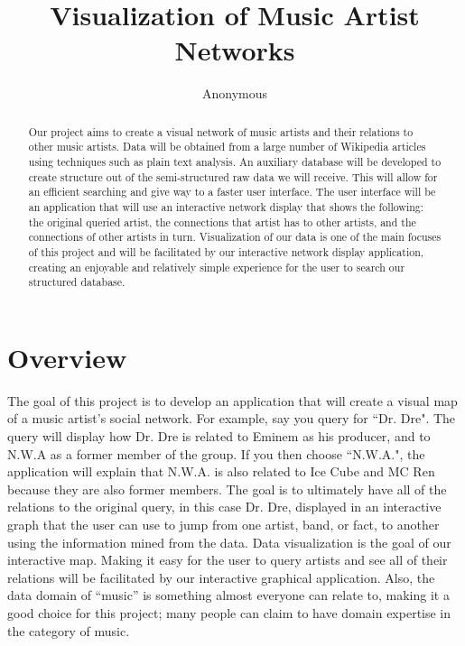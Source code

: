 \documentclass{sig-alternate}
\begin{document}
\title{Visualization of Music Artist Networks }
\author{
\alignauthor
Anonymous
}

\maketitle

\begin {abstract}
Our project aims to create a visual network of music artists 
and their relations to other music artists. Data will be obtained 
from a large number of Wikipedia articles using techniques such 
as plain text analysis. An auxiliary database will be developed to 
create structure out of the semi-structured raw data we will receive. 
This will allow for an efficient searching and give way to a faster user interface. 
The user interface will be an application that will use an interactive network 
display that shows the following: the original queried artist, the 
connections that artist has to other artists, and the connections 
of other artists in turn. Visualization of our data is one of 
the main focuses of this project and will be facilitated by our
 interactive network display application, creating an enjoyable and relatively 
simple experience for the user to search our structured database.

\end{abstract}

\section{Overview}
\label{overview}
The goal of this project is to develop an application that will create 
a visual map of a music artist's social network. For example, say you query 
for ``Dr. Dre". The query will display how Dr. Dre is related to Eminem as 
his producer, and to N.W.A as a former member of the group. If you then 
choose ``N.W.A.", the application will explain that N.W.A. is also related to 
 Ice Cube and MC Ren because they are also former members. The goal is 
to ultimately have all of the relations to the original query, in this case Dr. Dre, 
displayed in an interactive graph that the user can use to jump from one 
artist, band, or fact, to another using the information mined from the data. 
Data visualization is the goal of our interactive map. Making it easy 
for the user to query artists and see all of their relations will 
be facilitated by our interactive graphical application. Also, the data domain 
of ``music'' is something almost everyone can relate to, making it 
a good choice for this project; many people can claim to have domain 
expertise in the category of music.
\end{document}
